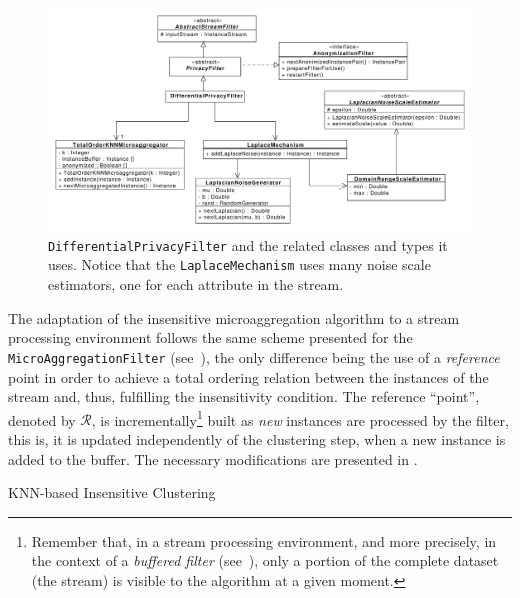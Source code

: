 \begin{figure}
	\centering
	\includegraphics[width=1.0\linewidth]{figures/class_DifferentialPrivacyFilter.pdf}
	\caption[\texttt{DifferentialPrivacyFilter} class environment.]{\texttt{DifferentialPrivacyFilter} and the related classes and types it uses. Notice that the \texttt{LaplaceMechanism} uses many noise scale estimators, one for each attribute in the stream.}
	\label{fig:class-differential-privacy-filter}
\end{figure}

The adaptation of the insensitive microaggregation algorithm to a stream processing environment follows the same scheme presented for the \texttt{MicroAggregationFilter} (see~), the only difference being the use of a \textit{reference} point in order to achieve a total ordering relation between the instances of the stream and, thus, fulfilling the insensitivity condition. The reference ``point'', denoted by $\mathcal{R}$, is incrementally\footnote{Remember that, in a stream processing environment, and more precisely, in the context of a \textit{buffered filter} (see~), only a portion of the complete dataset (the stream) is visible to the algorithm at a given moment.} built as \textit{new} instances are processed by the filter, this is, it is updated independently of the clustering step, when a new instance is added to the buffer. The necessary modifications are presented in .

\begin{algorithm}[h]
\caption{KNN-based Insensitive Clustering\label{al:insensitive microaggregation}}
\end{algorithm}

